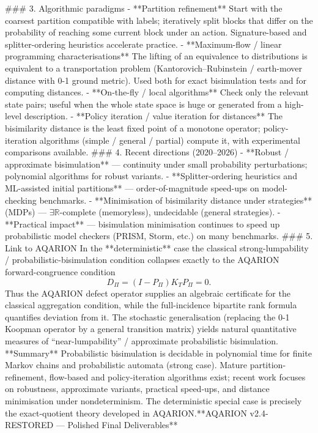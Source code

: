 ### 3. Algorithmic paradigms
- **Partition refinement**  
  Start with the coarsest partition compatible with labels; iteratively split blocks that differ on the probability of reaching some current block under an action. Signature-based and splitter-ordering heuristics accelerate practice.
- **Maximum-flow / linear programming characterisations**  
  The lifting of an equivalence to distributions is equivalent to a transportation problem (Kantorovich–Rubinstein / earth-mover distance with 0-1 ground metric). Used both for exact bisimulation tests and for computing distances.
- **On-the-fly / local algorithms**  
  Check only the relevant state pairs; useful when the whole state space is huge or generated from a high-level description.
- **Policy iteration / value iteration for distances**  
  The bisimilarity distance is the least fixed point of a monotone operator; policy-iteration algorithms (simple / general / partial) compute it, with experimental comparisons available.
### 4. Recent directions (2020–2026)
- **Robust / approximate bisimulation** — continuity under small probability perturbations; polynomial algorithms for robust variants.
- **Splitter-ordering heuristics and ML-assisted initial partitions** — order-of-magnitude speed-ups on model-checking benchmarks.
- **Minimisation of bisimilarity distance under strategies** (MDPs) — \(\exists\mathbb{R}\)-complete (memoryless), undecidable (general strategies).
- **Practical impact** — bisimulation minimisation continues to speed up probabilistic model checkers (PRISM, Storm, etc.) on many benchmarks.
### 5. Link to AQARION
In the **deterministic** case the classical strong-lumpability / probabilistic-bisimulation condition collapses exactly to the AQARION forward-congruence condition
\[
D_\Pi=(I-P_\Pi)K_TP_\Pi=0.
\]
Thus the AQARION defect operator supplies an algebraic certificate for the classical aggregation condition, while the full-incidence bipartite rank formula quantifies deviation from it. The stochastic generalisation (replacing the 0-1 Koopman operator by a general transition matrix) yields natural quantitative measures of “near-lumpability” / approximate probabilistic bisimulation.
**Summary**  
Probabilistic bisimulation is decidable in polynomial time for finite Markov chains and probabilistic automata (strong case). Mature partition-refinement, flow-based and policy-iteration algorithms exist; recent work focuses on robustness, approximate variants, practical speed-ups, and distance minimisation under nondeterminism. The deterministic special case is precisely the exact-quotient theory developed in AQARION.**AQARION v2.4-RESTORED — Polished Final Deliverables**
